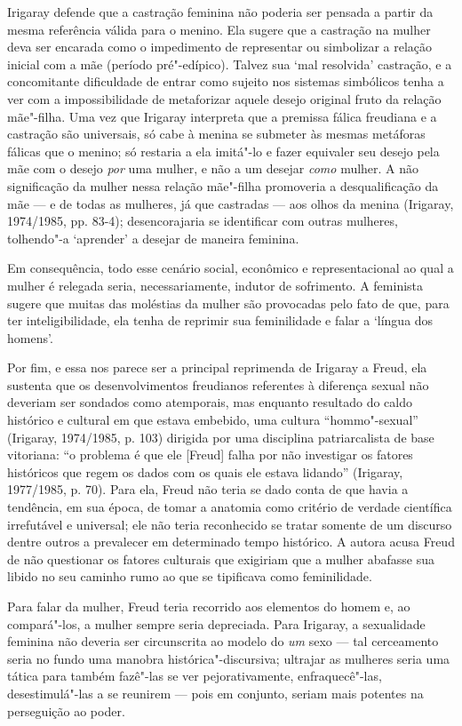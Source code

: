 Irigaray defende que a castração feminina não poderia ser pensada a
partir da mesma referência válida para o menino. Ela sugere que a
castração na mulher deva ser encarada como o impedimento de representar
ou simbolizar a relação inicial com a mãe (período pré"-edípico). Talvez
sua `mal resolvida' castração, e a concomitante dificuldade de entrar
como sujeito nos sistemas simbólicos tenha a ver com a impossibilidade
de metaforizar aquele desejo original fruto da relação mãe"-filha. Uma
vez que Irigaray interpreta que a premissa fálica freudiana e a
castração são universais, só cabe à menina se submeter às mesmas
metáforas fálicas que o menino; só restaria a ela imitá"-lo e fazer
equivaler seu desejo pela mãe com o desejo \emph{por} uma mulher, e não
a um desejar \emph{como} mulher. A não significação da mulher nessa
relação mãe"-filha promoveria a desqualificação da mãe --- e de todas as
mulheres, já que castradas --- aos olhos da menina (Irigaray, 1974/1985,
pp. 83-4); desencorajaria se identificar com outras mulheres, tolhendo"-a
`aprender' a desejar de maneira feminina.

Em consequência, todo esse cenário social, econômico e representacional
ao qual a mulher é relegada seria, necessariamente, indutor de
sofrimento. A feminista sugere que muitas das moléstias da mulher são
provocadas pelo fato de que, para ter inteligibilidade, ela tenha de
reprimir sua feminilidade e falar a `língua dos homens'.

Por fim, e essa nos parece ser a principal reprimenda de Irigaray a
Freud, ela sustenta que os desenvolvimentos freudianos referentes à
diferença sexual não deveriam ser sondados como atemporais, mas enquanto
resultado do caldo histórico e cultural em que estava embebido, uma
cultura ``hommo"-sexual'' (Irigaray, 1974/1985, p. 103) dirigida por uma
disciplina patriarcalista de base vitoriana: ``o problema é que ele
{[}Freud{]} falha por não investigar os fatores históricos que regem os
dados com os quais ele estava lidando'' (Irigaray, 1977/1985, p. 70).
Para ela, Freud não teria se dado conta de que havia a tendência, em sua
época, de tomar a anatomia como critério de verdade científica
irrefutável e universal; ele não teria reconhecido se tratar somente de
um discurso dentre outros a prevalecer em determinado tempo histórico. A
autora acusa Freud de não questionar os fatores culturais que exigiriam
que a mulher abafasse sua libido no seu caminho rumo ao que se
tipificava como feminilidade.

Para falar da mulher, Freud teria recorrido aos elementos do homem e, ao
compará"-los, a mulher sempre seria depreciada. Para Irigaray, a
sexualidade feminina não deveria ser circunscrita ao modelo do \emph{um}
sexo --- tal cerceamento seria no fundo uma manobra histórica"-discursiva;
ultrajar as mulheres seria uma tática para também fazê"-las se ver
pejorativamente, enfraquecê"-las, desestimulá"-las a se reunirem --- pois
em conjunto, seriam mais potentes na perseguição ao poder.


